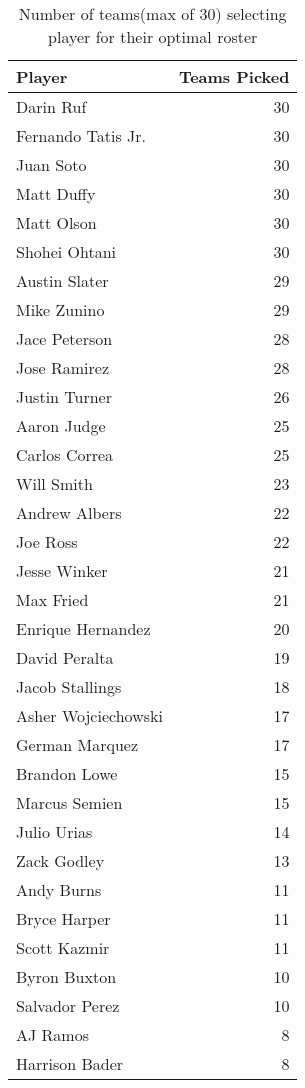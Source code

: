 \begin{table}

\caption{Number of teams(max of 30) selecting player for their optimal roster}
\centering
\begin{tabular}[t]{l|r}
\hline
Player & Teams Picked\\
\hline
Darin Ruf & 30\\
\hline
Fernando Tatis Jr. & 30\\
\hline
Juan Soto & 30\\
\hline
Matt Duffy & 30\\
\hline
Matt Olson & 30\\
\hline
Shohei Ohtani & 30\\
\hline
Austin Slater & 29\\
\hline
Mike Zunino & 29\\
\hline
Jace Peterson & 28\\
\hline
Jose Ramirez & 28\\
\hline
Justin Turner & 26\\
\hline
Aaron Judge & 25\\
\hline
Carlos Correa & 25\\
\hline
Will Smith & 23\\
\hline
Andrew Albers & 22\\
\hline
Joe Ross & 22\\
\hline
Jesse Winker & 21\\
\hline
Max Fried & 21\\
\hline
Enrique Hernandez & 20\\
\hline
David Peralta & 19\\
\hline
Jacob Stallings & 18\\
\hline
Asher Wojciechowski & 17\\
\hline
German Marquez & 17\\
\hline
Brandon Lowe & 15\\
\hline
Marcus Semien & 15\\
\hline
Julio Urias & 14\\
\hline
Zack Godley & 13\\
\hline
Andy Burns & 11\\
\hline
Bryce Harper & 11\\
\hline
Scott Kazmir & 11\\
\hline
Byron Buxton & 10\\
\hline
Salvador Perez & 10\\
\hline
AJ Ramos & 8\\
\hline
Harrison Bader & 8\\

\end{tabular}
\end{table}
